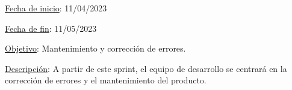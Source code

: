 
\underline{Fecha de inicio}: 11/04/2023

\underline{Fecha de fin}: 11/05/2023

\underline{Objetivo}:
Mantenimiento y corrección de errores.

\underline{Descripción}:
A partir de este sprint, el equipo de desarrollo se centrará en la corrección de errores y el mantenimiento del
producto.


